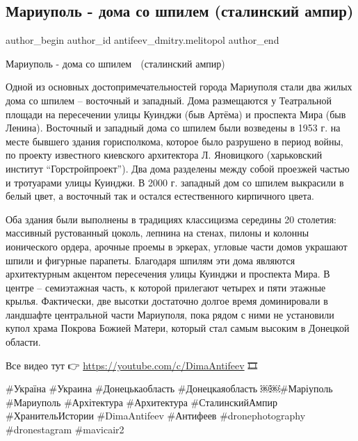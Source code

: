  
 
 
 
 

\subsection{Мариуполь - дома со шпилем (сталинский ампир)}
\label{sec:22_10_2021.fb.antifeev_dmitry.melitopol.1.mariupol_doma_so_shpilem_stalin_ampir}

\ifcmt
 author_begin
   author_id antifeev_dmitry.melitopol
 author_end
\fi

Мариуполь - дома со шпилем 🏣 (сталинский ампир)

Одной из основных достопримечательностей города Мариуполя стали два жилых дома
со шпилем – восточный и западный. Дома размещаются у Театральной площади на
пересечении улицы Куинджи (быв Артёма) и проспекта Мира (быв Ленина). Восточный
и западный дома со шпилем были возведены в 1953 г. на месте бывшего здания
горисполкома, которое было разрушено в период войны, по проекту известного
киевского архитектора Л. Яновицкого (харьковский институт \enquote{Горстройпроект}).
Два дома разделены между собой проезжей частью и тротуарами улицы Куинджи. В
2000 г. западный дом со шпилем выкрасили в белый цвет, а восточный так и
остался естественного кирпичного цвета.

Оба здания были выполнены в традициях классицизма середины 20 столетия:
массивный рустованный цоколь, лепнина на стенах, пилоны и колонны ионического
ордера, арочные проемы в эркерах, угловые части домов украшают шпили и фигурные
парапеты. Благодаря шпилям эти дома являются архитектурным акцентом пересечения
улицы Куинджи и проспекта Мира. В центре – семиэтажная часть, к которой
прилегают четырех и пяти этажные крылья. Фактически, две высотки достаточно
долгое время доминировали в ландшафте центральной части Мариуполя, пока рядом с
ними не установили купол храма Покрова Божией Матери, который стал самым
высоким в Донецкой области.

Все видео тут 👉 \url{https://youtube.com/c/DimaAntifeev} 🎞

\#Україна \#Украина \#Донецькаобласть \#Донецкаяобласть ￼￼\#Маріуполь \#Мариуполь
\#Архітектура \#Архитектура \#СталинскийАмпир \#ХранительИстории \#DimaAntifeev
\#Антифеев \#dronephotography \#dronestagram \#mavicair2
